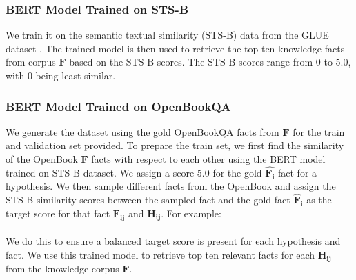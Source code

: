 \documentclass[11pt,a4paper]{article}
\begin{document}
\subsubsection{BERT Model Trained on STS-B}
\label{sts}
We train it on the semantic textual similarity (STS-B) data from the GLUE dataset \cite{wang2018glue}. The trained model is then used to retrieve the top ten knowledge facts from corpus $\mathbf{F}$ based on the STS-B scores. The STS-B scores range from 0 to 5.0, with 0 being least similar.

\subsubsection{BERT Model Trained on OpenBookQA}
\label{bbc}
 We generate the dataset using the gold OpenBookQA facts from $\mathbf{F}$ for the train and validation set provided. To prepare the train set, we first find the similarity of the OpenBook $\mathbf{F}$ facts with respect to each other using the BERT model trained on STS-B dataset. We assign a score 5.0 for the gold $\mathbf{\hat{F_i}}$ fact for a hypothesis. We then sample different facts from the OpenBook and assign the STS-B similarity scores between the sampled fact and the gold fact $\mathbf{\mathbf{\hat{F}_{i}}}$ as the target score for that fact $\mathbf{F_{ij}}$ and $\mathbf{H_{ij}}$. For example:\\

 \noindent
 \\
 
 We do this to ensure a balanced target score is present for each hypothesis and fact. We use this trained model to retrieve top ten relevant facts for each $\mathbf{H_{ij}}$ from the knowledge corpus $\mathbf{F}$. 
\end{document}
